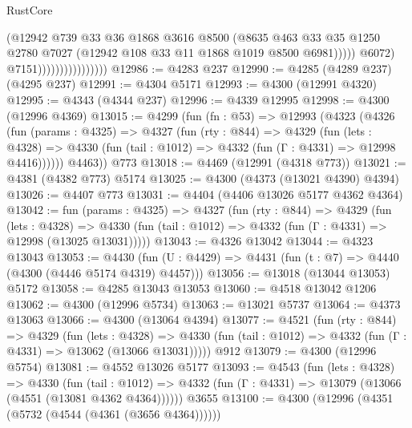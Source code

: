 \begin{lexlean}{RustCore}
\begin{coremodule}
                                          (@12942
                                            @739
                                            @33
                                            @36
                                            @1868
                                            @3616
                                            @8500
                                            (@8635
                                              @463
                                              @33
                                              @35
                                              @1250
                                              @2780
                                              @7027
                                              (@12942 @108 @33 @11 @1868 @1019 @8500 @6981)))))
                                      @6072)
                                    @7151))))))))))))))))
@12986 := @4283 @237
@12990 := @4285 (@4289 @237) (@4295 @237)
@12991 := @4304 @5171
@12993 := @4300 (@12991 @4320)
@12995 := @4343 (@4344 @237)
@12996 := @4339 @12995
@12998 := @4300 (@12996 @4369)
@13015 := @4299
    (fun (fn : @53) =>
    @12993
      (@4323
        (@4326
          (fun (params : @4325) =>
          @4327
            (fun (rty : @844) =>
            @4329
              (fun (lets : @4328) =>
              @4330 (fun (tail : @1012) => @4332 (fun (Γ : @4331) => @12998 @4416))))))
        @4463))
    @773
@13018 := @4469 (@12991 (@4318 @773))
@13021 := @4381 (@4382 @773) @5174
@13025 := @4300 (@4373 (@13021 @4390) @4394)
@13026 := @4407 @773
@13031 := @4404 (@4406 @13026 @5177 @4362 @4364)
@13042 := fun (params : @4325) =>
  @4327
    (fun (rty : @844) =>
    @4329
      (fun (lets : @4328) =>
      @4330 (fun (tail : @1012) => @4332 (fun (Γ : @4331) => @12998 (@13025 @13031)))))
@13043 := @4326 @13042
@13044 := @4323 @13043
@13053 := @4430 (fun (U : @4429) => @4431 (fun (t : @7) => @4440 (@4300 (@4446 @5174 @4319) @4457)))
@13056 := @13018 (@13044 @13053) @5172
@13058 := @4285 @13043 @13053
@13060 := @4518 @13042 @1206
@13062 := @4300 (@12996 @5734)
@13063 := @13021 @5737
@13064 := @4373 @13063
@13066 := @4300 (@13064 @4394)
@13077 := @4521
    (fun (rty : @844) =>
    @4329
      (fun (lets : @4328) =>
      @4330 (fun (tail : @1012) => @4332 (fun (Γ : @4331) => @13062 (@13066 @13031)))))
    @912
@13079 := @4300 (@12996 @5754)
@13081 := @4552 @13026 @5177
@13093 := @4543
    (fun (lets : @4328) =>
    @4330
      (fun (tail : @1012) =>
      @4332 (fun (Γ : @4331) => @13079 (@13066 (@4551 (@13081 @4362 @4364))))))
    @3655
@13100 := @4300 (@12996 (@4351 (@5732 (@4544 (@4361 (@3656 @4364))))))

\end{coremodule}
\end{lexlean}
